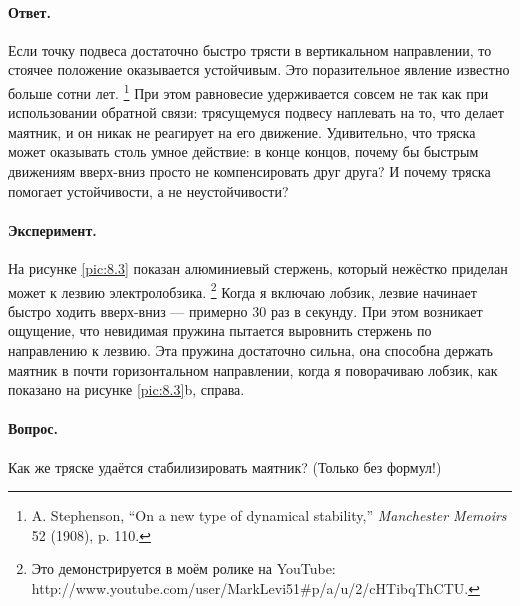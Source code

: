 \paragraph{Ответ.}
Если точку подвеса достаточно быстро трясти в вертикальном направлении, то стоячее положение оказывается устойчивым.
Это поразительное явление известно больше сотни лет.%
\footnote{A. Stephenson, ``On a new type of dynamical stability,'' \emph{Manchester Memoirs} 52 (1908), p. 110.}
При этом равновесие удерживается совсем не так как при использовании обратной связи:
трясущемуся подвесу наплевать на то, что делает маятник, и он никак не реагирует на его движение.
Удивительно, что тряска может оказывать столь умное действие:
в конце концов, почему бы быстрым движениям вверх-вниз просто не компенсировать друг друга?
И почему тряска помогает устойчивости, а не неустойчивости?

\paragraph{Эксперимент.}
На рисунке \ref{pic:8.3} показан алюминиевый стержень, который нежёстко приделан может к лезвию электролобзика.%
\footnote{Это демонстрируется в моём ролике на YouTube: http://www.youtube.com/user/MarkLevi51\#p/a/u/2/cHTibqThCTU.}
Когда я включаю лобзик, лезвие начинает быстро ходить вверх-вниз --- примерно 30 раз в секунду.
При этом возникает ощущение, что невидимая пружина пытается выровнить стержень по направлению к лезвию.
Эта пружина достаточно сильна, она способна держать маятник в почти горизонтальном направлении, когда я поворачиваю лобзик, как показано на рисунке \ref{pic:8.3}b, справа.

\paragraph{Вопрос.}
Как же тряске удаётся стабилизировать маятник?
(Только без формул!)


